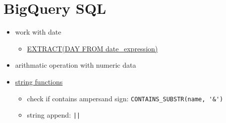 \documentclass{article}
\begin{document}
\section{BigQuery SQL}
\begin{itemize}
\item work with date
	\begin{itemize}
	\item \href{https://cloud.google.com/bigquery/docs/reference/standard-sql/date_functions#extract}{EXTRACT(DAY FROM date\_expression)}
	\end{itemize}
\item arithmatic operation with numeric data
\item \href{https://cloud.google.com/bigquery/docs/reference/standard-sql/string_functions}{string functions}
	\begin{itemize}
	\item check if contains ampersand sign: \verb|CONTAINS_SUBSTR(name, '&')|
	\item string append: \texttt{||}
	\end{itemize}
\end{itemize}
\end{document}
